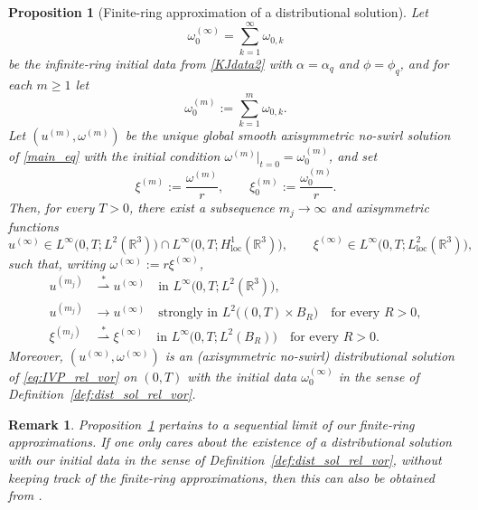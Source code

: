 \documentclass[reqno,11pt]{amsart}
\newtheorem{remark}{Remark}[section]
\newtheorem{proposition}[theorem]{Proposition}
\begin{document}
\begin{proposition}[Finite-ring approximation of a distributional solution]
\label{prop:finite_ring_limit_distributional}
Let
\[
\omega_0^{(\infty)}=\sum_{k=1}^\infty \omega_{0,k}
\]
be the infinite-ring initial data from \eqref{KJdata2} with $\alpha=\alpha_q$ and $\phi=\phi_q$, and for each \(m\ge 1\) let
\[
\omega_0^{(m)}:=\sum_{k=1}^m \omega_{0,k}.
\]
Let \((u^{(m)},\omega^{(m)})\) be the unique global smooth axisymmetric no-swirl
solution of \eqref{main_eq} with the initial condition \(\omega^{(m)}|_{t=0}=\omega_0^{(m)}\), and set
\[
\xi^{(m)}:=\frac{\omega^{(m)}}{r},
\qquad
\xi_0^{(m)}:=\frac{\omega_0^{(m)}}{r}.
\]
Then, for every \(T>0\), there exist a subsequence \(m_j\to\infty\) and
axisymmetric functions
\[
u^{(\infty)}\in L^\infty\bigl(0,T;L^2(\mathbb{R}^3)\bigr)
\cap L^\infty\bigl(0,T;H^1_{\mathrm{loc}}(\mathbb{R}^3)\bigr),
\qquad
\xi^{(\infty)}\in L^\infty\bigl(0,T;L^2_{\mathrm{loc}}(\mathbb{R}^3)\bigr),
\]
such that, writing \(\omega^{(\infty)}:=r\xi^{(\infty)}\),
\begin{align*}
u^{(m_j)} &\overset{*}{\rightharpoonup} u^{(\infty)}
\quad\text{in }L^\infty\bigl(0,T;L^2(\mathbb{R}^3)\bigr),
\\
u^{(m_j)} &\to u^{(\infty)}
\quad\text{strongly in }L^2\bigl((0,T)\times B_R\bigr)
\quad\text{for every }R>0,
\\
\xi^{(m_j)} &\overset{*}{\rightharpoonup} \xi^{(\infty)}
\quad\text{in }L^\infty\bigl(0,T;L^2(B_R)\bigr)
\quad\text{for every }R>0.
\end{align*}
Moreover, \((u^{(\infty)},\omega^{(\infty)})\) is an (axisymmetric no-swirl) distributional solution of
\eqref{eq:IVP_rel_vor} on \((0,T)\) with the initial data \(\omega_0^{(\infty)}\) in the sense of
Definition~\ref{def:dist_sol_rel_vor}.
\end{proposition}

\begin{remark}
Proposition~\ref{prop:finite_ring_limit_distributional} pertains to a sequential limit of our finite-ring approximations. If one only cares about the existence of a distributional solution with our initial data in the sense of Definition~\ref{def:dist_sol_rel_vor}, without keeping track of the finite-ring approximations, then this can also be obtained from \cite[Theorems~1--2]{NobiliSeis22}.
\end{remark}
\end{document}
